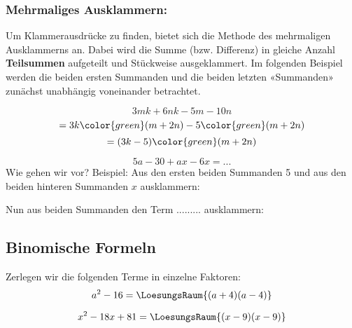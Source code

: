 


\newpage



\subsubsection{Mehrmaliges Ausklammern:}
 Um Klammerausdrücke zu finden, bietet sich die Methode des mehrmaligen Ausklammerns an.
 Dabei wird die Summe (bzw. Differenz) in gleiche Anzahl \textbf{Teilsummen} aufgeteilt und Stückweise ausgeklammert.
 Im folgenden Beispiel werden die beiden ersten Summanden und die beiden letzten «Summanden» zunächst unabhängig voneinander betrachtet.

$$3mk+6nk-5m-10n $$
$$= 3k{\color{green}(m+2n)}-5{\color{green}(m+2n)} $$
$$= (3k-5){\color{green}(m+2n)}$$


\begin{beispiel}{}{}
  $$5a-30+ax-6x = ...$$
  Wie gehen wir vor? Beispiel: Aus den ersten beiden Summanden 5 und
  aus den beiden hinteren Summanden $x$ ausklammern:


  Nun aus beiden Summanden den Term ......... 
  ausklammern:

\end{beispiel}
\newpage


\subsection{Binomische Formeln}%



Zerlegen wir die folgenden Terme in einzelne Faktoren:
$$ a^2 - 16 = \LoesungsRaum{(a+4)(a-4)} $$

$$x^2 -18x + 81 = \LoesungsRaum{(x-9)(x-9)}$$

